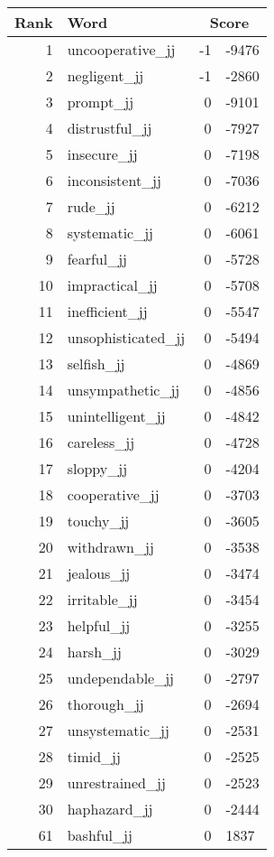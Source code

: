 \begin{longtable}[!htbp]{| rlr@{.}l |}
    \hline
    \textbf{Rank} & \textbf{Word} & \multicolumn{2}{c|}{\textbf{Score}} \\
    \hline
    \endhead
    1 & uncooperative\_jj & -1 & -9476 \\
    2 & negligent\_jj & -1 & -2860 \\
    3 & prompt\_jj & 0 & -9101 \\
    4 & distrustful\_jj & 0 & -7927 \\
    5 & insecure\_jj & 0 & -7198 \\
    6 & inconsistent\_jj & 0 & -7036 \\
    7 & rude\_jj & 0 & -6212 \\
    8 & systematic\_jj & 0 & -6061 \\
    9 & fearful\_jj & 0 & -5728 \\
    10 & impractical\_jj & 0 & -5708 \\
    11 & inefficient\_jj & 0 & -5547 \\
    12 & unsophisticated\_jj & 0 & -5494 \\
    13 & selfish\_jj & 0 & -4869 \\
    14 & unsympathetic\_jj & 0 & -4856 \\
    15 & unintelligent\_jj & 0 & -4842 \\
    16 & careless\_jj & 0 & -4728 \\
    17 & sloppy\_jj & 0 & -4204 \\
    18 & cooperative\_jj & 0 & -3703 \\
    19 & touchy\_jj & 0 & -3605 \\
    20 & withdrawn\_jj & 0 & -3538 \\
    21 & jealous\_jj & 0 & -3474 \\
    22 & irritable\_jj & 0 & -3454 \\
    23 & helpful\_jj & 0 & -3255 \\
    24 & harsh\_jj & 0 & -3029 \\
    25 & undependable\_jj & 0 & -2797 \\
    26 & thorough\_jj & 0 & -2694 \\
    27 & unsystematic\_jj & 0 & -2531 \\
    28 & timid\_jj & 0 & -2525 \\
    29 & unrestrained\_jj & 0 & -2523 \\
    30 & haphazard\_jj & 0 & -2444 \\
    61 & bashful\_jj & 0 & 1837 \\

\end{longtable}

